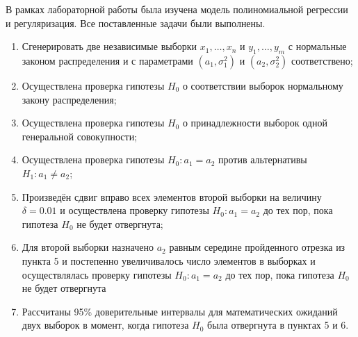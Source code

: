 
В рамках лабораторной работы была изучена модель полиномиальной регрессии и регуляризация. Все поставленные задачи были выполнены.

\begin{enumerate}[label*=\arabic*.]
	\item Сгенерировать две независимые выборки $x_1,…,x_n$ и $y_1,…,y_m$ с нормальные законом распределения и с параметрами  $(a_1,\sigma_1^2 )$ и $(a_2,\sigma_2^2 )$  соответствено;
	\item Осуществлена проверка гипотезы $H_0$ о соответствии выборок нормальному закону распределения; 
	\item Осуществлена проверка гипотезы $H_0$ о принадлежности выборок одной генеральной совокупности;
	\item Осуществлена проверка гипотезы $H_0: a_1 = a_2$ против альтернативы $H_1: a_1 \neq a_2$;
	\item Произведён сдвиг вправо всех элементов второй выборки на величину $\delta=0.01$ и осуществлена проверку гипотезы $H_0: a_1= a_2$ до тех пор, пока гипотеза $H_0$ не будет отвергнута;
	\item Для второй выборки назначено $a_2$ равным середине пройденного отрезка из пункта 5 и постепенно увеличивалось число элементов в выборках и осуществлялась проверку гипотезы $H_0: a_1= a_2$ до тех пор, пока гипотеза $H_0$ не будет отвергнута
	\item Рассчитаны 95\% доверительные интервалы для математических ожиданий двух выборок в момент, когда гипотеза $H_0$ была отвергнута в пунктах 5 и 6.
\end{enumerate}

